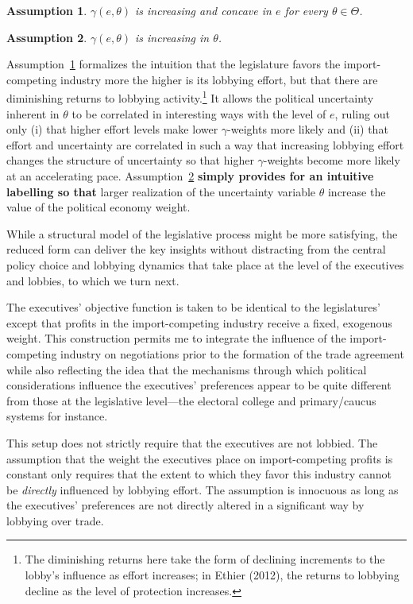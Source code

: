 \documentclass[10pt]{article}
\newtheorem{assumption}{Assumption}
\newcommand{\ta}{\theta}
\newcommand{\ga}{\gamma}
\begin{document}
\begin{assumption}
  $\ga(e,\ta)$ is increasing and concave in $e$ for every $\ta \in \Theta$.
  \label{as:ga_c}
\end{assumption}

\begin{assumption}
  $\ga(e,\ta)$ is increasing in $\ta$.
  \label{as:ga_ta}
\end{assumption}

Assumption~\ref{as:ga_c} formalizes the intuition that the legislature favors the import-competing industry more the higher is its lobbying effort, but that there are diminishing returns to lobbying activity.\footnote{The diminishing returns here take the form of declining increments to the lobby's influence as effort increases; in Ethier (2012), the returns to lobbying decline as the level of protection increases.} It allows the political uncertainty inherent in $\ta$ to be correlated in interesting ways with the level of $e$, ruling out only (i) that higher effort levels make lower $\ga$-weights more likely and (ii) that effort and uncertainty are correlated in such a way that increasing lobbying effort changes the structure of uncertainty so that higher $\ga$-weights become more likely at an accelerating pace. Assumption~\ref{as:ga_ta} \textbf{simply provides for an intuitive labelling so that} larger realization of the uncertainty variable $\ta$ increase the value of the political economy weight.

While a structural model of the legislative process might be more satisfying, the reduced form can deliver the key insights without distracting from the central policy choice and lobbying dynamics that take place at the level of the executives and lobbies, to which we turn next. 

The executives' objective function is taken to be identical to the legislatures' except that profits in the import-competing industry receive a fixed, exogenous weight. This construction permits me to integrate the influence of the import-competing industry on negotiations prior to the formation of the trade agreement while also reflecting the idea that the mechanisms through which political considerations influence the executives' preferences appear to be quite different from those at the legislative level---the electoral college and primary/caucus systems for instance.

This setup does not strictly require that the executives are not lobbied. The assumption that the weight the executives place on import-competing profits is constant only requires that the extent to which they favor this industry cannot be \textit{directly} influenced by lobbying effort. The assumption is innocuous as long as the executives' preferences are not directly altered in a significant way by lobbying over trade.
\end{document}
